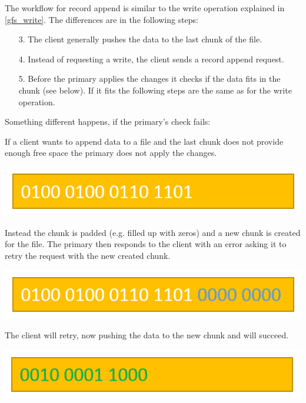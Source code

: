 \documentclass{sig-alternate}
\begin{document}
The workflow for record append is similar to the write operation explained in \ref{gfs_write}. The differences are in the following steps:

\begin{enumerate}
\item[3.]
The client generally pushes the data to the last chunk of the file.

\item[4.]
Instead of requesting a write, the client sends a record append request.

\item[5.]
Before the primary applies the changes it checks if the data fits in the chunk (see below). If it fits the following steps are the same as for the write operation.
\end{enumerate}

Something different happens, if the primary's check fails:

If a client wants to append data to a file and the last chunk does not provide enough free space the primary does not apply the changes.

\includegraphics[width=\linewidth]{gfs_pics/writeappend_1.png}

Instead the chunk is padded (e.g. filled up with zeros) and a new chunk is created for the file. The primary then responds to the client with an error asking it to retry the request with the new created chunk.

\includegraphics[width=\linewidth]{gfs_pics/writeappend_2.png}

The client will retry, now pushing the data to the new chunk and will succeed.

\includegraphics[width=\linewidth]{gfs_pics/writeappend_3.png}
\end{document}
